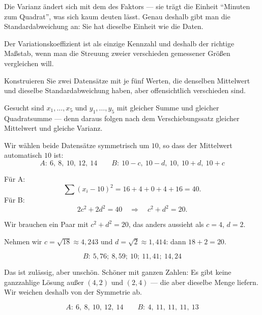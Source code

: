\begin{aufgabe}
Die Varianz ändert sich mit dem  des Faktors --- sie trägt die Einheit \enquote{Minuten zum Quadrat}, was sich kaum deuten lässt. Genau deshalb gibt man die Standardabweichung an: Sie hat dieselbe Einheit wie die Daten.

Der Variationskoeffizient ist als einzige Kennzahl  und deshalb der richtige Maßstab, wenn man die Streuung zweier verschieden gemessener Größen vergleichen will.
\end{aufgabe}

\begin{aufgabe}
Konstruieren Sie zwei Datensätze mit je fünf Werten, die denselben Mittelwert und dieselbe Standardabweichung haben, aber offensichtlich verschieden sind.

\loesung
{}
Gesucht sind $x_1,\ldots,x_5$ und $y_1,\ldots,y_5$ mit gleicher Summe und gleicher Quadratsumme --- denn daraus folgen nach dem Verschiebungssatz gleicher Mittelwert und gleiche Varianz.

Wir wählen beide Datensätze symmetrisch um $10$, so dass der Mittelwert automatisch $10$ ist:
\[ A: \ 6,\ 8,\ 10,\ 12,\ 14 \qquad B: \ 10-c,\ 10-d,\ 10,\ 10+d,\ 10+c \]

Für A:
\[ \sum (x_i - 10)^2 = 16 + 4 + 0 + 4 + 16 = 40 . \]
Für B:
\[ 2c^2 + 2d^2 = 40 \quad\Longrightarrow\quad c^2 + d^2 = 20 . \]

Wir brauchen ein Paar mit $c^2 + d^2 = 20$, das anders aussieht als $c=4$, $d=2$.

Nehmen wir $c = \sqrt{18} \approx 4{,}243$ und $d = \sqrt{2} \approx 1{,}414$: dann $18 + 2 = 20$. \checkmark

\[ B: \ 5{,}76;\ 8{,}59;\ 10;\ 11{,}41;\ 14{,}24 \]

Das ist zulässig, aber unschön. Schöner mit ganzen Zahlen: Es gibt keine ganzzahlige Lösung außer $(4,2)$ und $(2,4)$ --- die aber dieselbe Menge liefern. Wir weichen deshalb von der Symmetrie ab.

\[ A: \ 6,\ 8,\ 10,\ 12,\ 14 \qquad B: \ 4,\ 11,\ 11,\ 11,\ 13 \]


\end{aufgabe}
